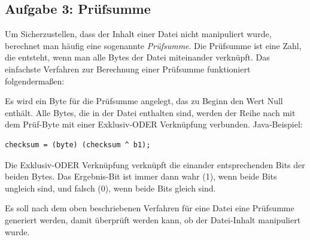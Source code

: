 \subsection{Aufgabe 3: Prüfsumme}

Um Sicherzustellen, dass der Inhalt einer Datei nicht manipuliert wurde,
berechnet man häufig eine sogenannte \emph{Prüfsumme}. Die Prüfsumme ist eine
Zahl, die entsteht, wenn man alle Bytes der Datei miteinander verknüpft. Das
einfachste Verfahren zur Berechnung einer Prüfsumme funktioniert
folgendermaßen:

Es wird ein Byte für die Prüfsumme angelegt, das zu Beginn den Wert Null
enthält. Alle Bytes, die in der Datei enthalten sind, werden der Reihe nach mit
dem Prüf-Byte mit einer Exklusiv-ODER Verknüpfung verbunden. Java-Beispiel:

\begin{lstlisting}
checksum = (byte) (checksum ^ b1);
\end{lstlisting}

Die Exklusiv-ODER Verknüpfung verknüpft die einander entsprechenden Bits der
beiden Bytes. Das Ergebnis-Bit ist immer dann wahr (1), wenn beide Bits
ungleich sind, und falsch (0), wenn beide Bits gleich sind.

Es soll nach dem oben beschriebenen Verfahren für eine Datei eine Prüfsumme
generiert werden, damit überprüft werden kann, ob der Datei-Inhalt manipuliert
wurde.

